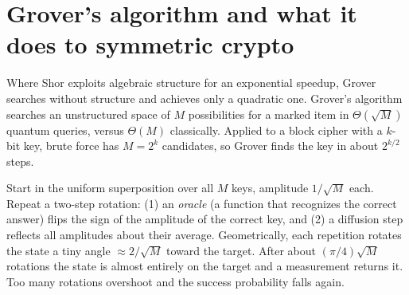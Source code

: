\section{Grover's algorithm and what it does to symmetric crypto}
\label{ch35:grover}

Where Shor exploits algebraic structure for an exponential speedup, Grover searches without structure and achieves only a quadratic one. Grover's algorithm searches an unstructured space of $M$ possibilities for a marked item in $\Theta(\sqrt{M})$ quantum queries, versus $\Theta(M)$ classically. Applied to a block cipher with a $k$-bit key, brute force has $M=2^k$ candidates, so Grover finds the key in about $2^{k/2}$ steps.

Start in the uniform superposition over all $M$ keys, amplitude $1/\sqrt M$ each. Repeat a two-step rotation: (1) an \emph{oracle} (a function that recognizes the correct answer) flips the sign of the amplitude of the correct key, and (2) a diffusion step reflects all amplitudes about their average. Geometrically, each repetition rotates the state a tiny angle $\approx 2/\sqrt M$ toward the target. After about $(\pi/4)\sqrt M$ rotations the state is almost entirely on the target and a measurement returns it. Too many rotations overshoot and the success probability falls again.

